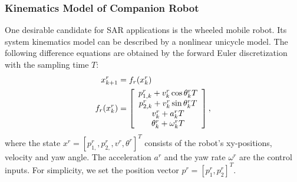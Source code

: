 \documentclass[journal]{IEEEtran}
\begin{document}
\subsubsection{Kinematics Model of Companion Robot} 
One desirable candidate for SAR applications is the wheeled mobile robot. Its system kinematics model can be described by a nonlinear unicycle model. The following difference equations are obtained by the forward Euler discretization with the sampling time $T$:
\begin{align}
	x^r_{k+1}&=f_r(x^r_k)\notag\\
    f_r(x^r_k)&=\left[
			\begin{array}{c}
				p^r_{1,k}+v^r_k\cos \theta^r_k T\\
				p^r_{2,k}+v^r_k\sin \theta^r_k T\\			
            v^r_k+a^r_k T\\
		    \theta^r_k+\omega^r_k T
            \end{array}\right],\label{eqn:robot_model}
\end{align}
where the state $x^r=\left[p^r_{1,}, p^r_{2,}, v^r, \theta^r\right]^T$ consists of the robot's xy-positions, velocity and yaw angle. The acceleration $a^r$ and the yaw rate $\omega^r$ are the control inputs. For simplicity, we set the position vector $p^r =\left[p^r_{1}, p^r_{2}\right]^T$. 
\end{document}
